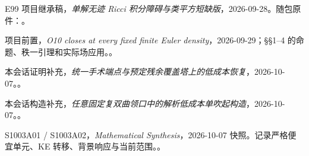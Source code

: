 \documentclass[UTF8,11pt,fontset=none]{ctexart}
\theoremstyle{definition}
\theoremstyle{remark}
\begin{document}
\begin{thebibliography}{E99}
\small
{} 项目继承稿，\emph{单解无迹 Ricci 积分障碍与类平方短缺版}，2026-09-28。随包原件：。

 项目前置，\emph{O10 closes at every fixed finite Euler density}，2026-09-29；§§1--4 的命题、秩一引理和实际场应用。。

 本会话证明补充，\emph{统一手术端点与预定残余覆盖塔上的低成本恢复}，2026-10-07。。

 本会话构造补充，\emph{任意固定复双曲领口中的解析低成本单吹起构造}，2026-10-07。。

 S1003A01 / S1003A02，\emph{Mathematical Synthesis}，2026-10-07 快照。记录严格便宜单元、KE 转移、背景响应与当前范围。。

\end{thebibliography}
\end{document}
